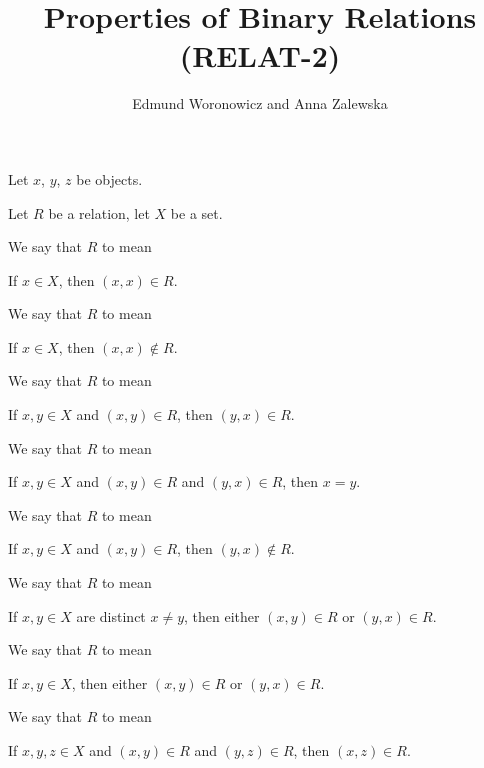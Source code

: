 \documentclass{article}
\title{Properties of Binary Relations (RELAT-2)}
\author{Edmund Woronowicz and Anna Zalewska}
\begin{document}
\maketitle

Let $x$, $y$, $z$ be objects.

\begin{definition}
Let $R$ be a relation, let $X$ be a set.

We say that $R$  to mean
\begin{defn}
\item If $x\in X$, then $(x,x)\in R$.
\end{defn}
We say that $R$  to mean
\begin{defn}
\item If $x\in X$, then $(x,x)\notin R$.
\end{defn}
We say that $R$  to mean
\begin{defn}
\item If $x,y\in X$ and $(x,y)\in R$, then $(y,x)\in R$.
\end{defn}
We say that $R$  to mean
\begin{defn}
\item If $x,y\in X$ and $(x,y)\in R$ and $(y,x)\in R$, then $x=y$.
\end{defn}
We say that $R$  to mean
\begin{defn}
\item If $x,y\in X$ and $(x,y)\in R$, then $(y,x)\notin R$.
\end{defn}
We say that $R$  to mean
\begin{defn}
\item If $x,y\in X$ are distinct $x\neq y$, then either $(x,y)\in R$ or $(y,x)\in R$.
\end{defn}
We say that $R$  to mean
\begin{defn}
\item If $x,y\in X$, then either $(x,y)\in R$ or $(y,x)\in R$.
\end{defn}
We say that $R$  to mean
\begin{defn}
\item If $x,y,z\in X$ and $(x,y)\in R$ and $(y,z)\in R$, then $(x,z)\in R$.
\end{defn}
\end{definition}
\end{document}

